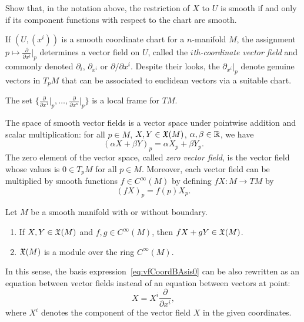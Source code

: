 \begin{exercise}
  Show that, in the notation above, the restriction of $X$ to $U$ is smooth if and only if its component functions with respect to the chart are smooth.
\end{exercise}

\begin{example}
  If $(U, (x^i))$ is a smooth coordinate chart for a $n$-manifold $M$, the assignment $p \mapsto \frac{\partial}{\partial x^i}\big|_p$ determines a vector field on $U$, called the \emph{$i$th-coordinate vector field} and commonly denoted $\partial_{i}$, $\partial_{x^i}$ or $\partial/\partial x^i$.
  Despite their looks, the $\partial_{x^i}|_p$ denote genuine vectors in $T_p M$ that can be associated to euclidean vectors via a suitable chart.

  The set $\{\frac{\partial}{\partial x^1}\big|_p, \ldots, \frac{\partial}{\partial x^n}\big|_p\}$ is a local frame for $TM$.
\end{example}

The space of smooth vector fields is a vector space under pointwise addition and scalar multiplication: for all $p\in M$, $X,Y\in\mathfrak{X}(M)$, $\alpha, \beta \in \mathbb{R}$, we have
\begin{equation}
  (\alpha X + \beta Y)_p = \alpha X_p + \beta Y_p.
\end{equation}
The zero element of the vector space, called \emph{zero vector field}, is the vector field whose values is $0\in T_pM$ for all $p\in M$.
Moreover, each vector field can be multiplied by smooth functions $f\in C^\infty(M)$ by defining $fX:M\to  TM$ by
\begin{equation}
  (fX)_p = f(p)X_p.
\end{equation}

\begin{proposition}
  Let $M$ be a smooth manifold with or without boundary.
  \begin{enumerate}
    \item If $X,Y \in \mathfrak{X}(M)$ and $f,g\in C^\infty(M)$, then $fX+gY \in\mathfrak{X}(M)$.
    \item $\mathfrak{X}(M)$ is a module over the ring $C^\infty(M)$.
  \end{enumerate}
\end{proposition}

In this sense, the basis expression~\eqref{eq:vfCoordBAsis0} can be also rewritten as an equation between vector fields instead of an equation between vectors at point:
\begin{equation}\label{eq:vfCoordBAsis}
  X = X^i \frac{\partial}{\partial x^i},
\end{equation}
where $X^i$ denotes the component of the vector field $X$ in the given coordinates.

